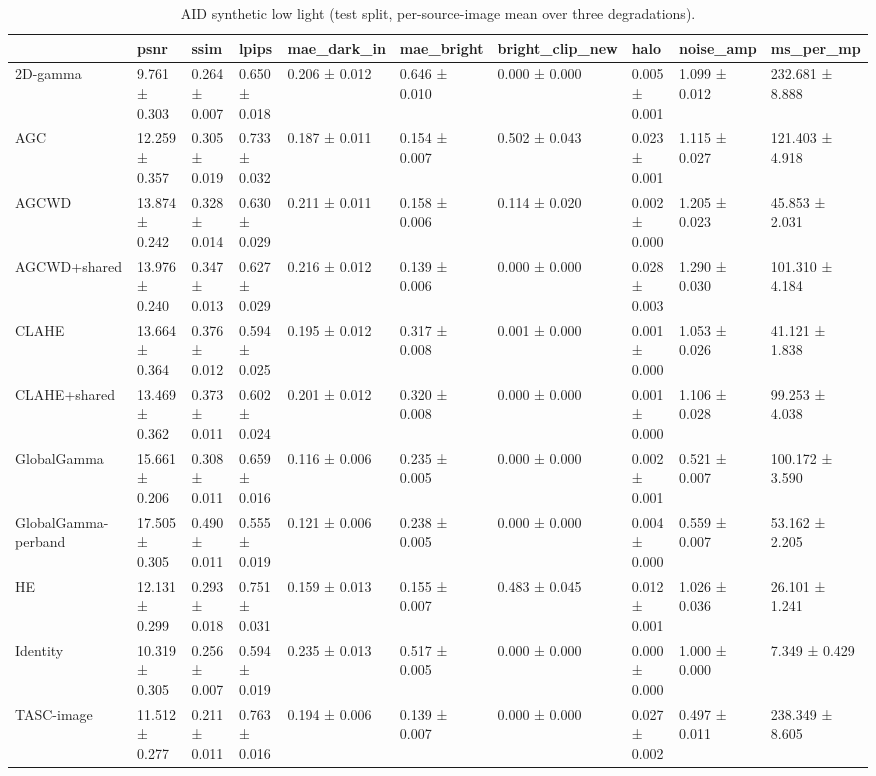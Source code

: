 \begin{table}[t]
\caption{AID synthetic low light (test split, per-source-image mean over three degradations).}
\label{tab:aid_summary}
\begin{tabular}{llllllllll}
\toprule
 & psnr & ssim & lpips & mae\_dark\_in & mae\_bright & bright\_clip\_new & halo & noise\_amp & ms\_per\_mp \\
\midrule
2D-gamma & 9.761 ± 0.303 & 0.264 ± 0.007 & 0.650 ± 0.018 & 0.206 ± 0.012 & 0.646 ± 0.010 & 0.000 ± 0.000 & 0.005 ± 0.001 & 1.099 ± 0.012 & 232.681 ± 8.888 \\
AGC & 12.259 ± 0.357 & 0.305 ± 0.019 & 0.733 ± 0.032 & 0.187 ± 0.011 & 0.154 ± 0.007 & 0.502 ± 0.043 & 0.023 ± 0.001 & 1.115 ± 0.027 & 121.403 ± 4.918 \\
AGCWD & 13.874 ± 0.242 & 0.328 ± 0.014 & 0.630 ± 0.029 & 0.211 ± 0.011 & 0.158 ± 0.006 & 0.114 ± 0.020 & 0.002 ± 0.000 & 1.205 ± 0.023 & 45.853 ± 2.031 \\
AGCWD+shared & 13.976 ± 0.240 & 0.347 ± 0.013 & 0.627 ± 0.029 & 0.216 ± 0.012 & 0.139 ± 0.006 & 0.000 ± 0.000 & 0.028 ± 0.003 & 1.290 ± 0.030 & 101.310 ± 4.184 \\
CLAHE & 13.664 ± 0.364 & 0.376 ± 0.012 & 0.594 ± 0.025 & 0.195 ± 0.012 & 0.317 ± 0.008 & 0.001 ± 0.000 & 0.001 ± 0.000 & 1.053 ± 0.026 & 41.121 ± 1.838 \\
CLAHE+shared & 13.469 ± 0.362 & 0.373 ± 0.011 & 0.602 ± 0.024 & 0.201 ± 0.012 & 0.320 ± 0.008 & 0.000 ± 0.000 & 0.001 ± 0.000 & 1.106 ± 0.028 & 99.253 ± 4.038 \\
GlobalGamma & 15.661 ± 0.206 & 0.308 ± 0.011 & 0.659 ± 0.016 & 0.116 ± 0.006 & 0.235 ± 0.005 & 0.000 ± 0.000 & 0.002 ± 0.001 & 0.521 ± 0.007 & 100.172 ± 3.590 \\
GlobalGamma-perband & 17.505 ± 0.305 & 0.490 ± 0.011 & 0.555 ± 0.019 & 0.121 ± 0.006 & 0.238 ± 0.005 & 0.000 ± 0.000 & 0.004 ± 0.000 & 0.559 ± 0.007 & 53.162 ± 2.205 \\
HE & 12.131 ± 0.299 & 0.293 ± 0.018 & 0.751 ± 0.031 & 0.159 ± 0.013 & 0.155 ± 0.007 & 0.483 ± 0.045 & 0.012 ± 0.001 & 1.026 ± 0.036 & 26.101 ± 1.241 \\
Identity & 10.319 ± 0.305 & 0.256 ± 0.007 & 0.594 ± 0.019 & 0.235 ± 0.013 & 0.517 ± 0.005 & 0.000 ± 0.000 & 0.000 ± 0.000 & 1.000 ± 0.000 & 7.349 ± 0.429 \\
TASC-image & 11.512 ± 0.277 & 0.211 ± 0.011 & 0.763 ± 0.016 & 0.194 ± 0.006 & 0.139 ± 0.007 & 0.000 ± 0.000 & 0.027 ± 0.002 & 0.497 ± 0.011 & 238.349 ± 8.605 \\

\end{tabular}
\end{table}
